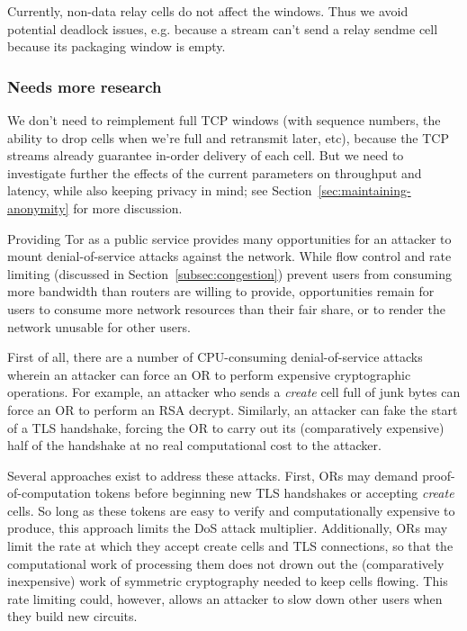 \documentclass[times,10pt,twocolumn]{article}
\begin{document}
Currently, non-data relay cells do not affect the windows. Thus we
avoid potential deadlock issues, e.g. because a stream can't send a
relay sendme cell because its packaging window is empty.

\subsubsection{Needs more research}

We don't need to reimplement full TCP windows (with sequence numbers,
the ability to drop cells when we're full and retransmit later, etc),
because the TCP streams already guarantee in-order delivery of each
cell. But we need to investigate further the effects of the current
parameters on throughput and latency, while also keeping privacy in mind;
see Section~\ref{sec:maintaining-anonymity} for more discussion.


\label{subsec:dos}

Providing Tor as a public service provides many opportunities for an
attacker to mount denial-of-service attacks against the network.  While
flow control and rate limiting (discussed in
Section~\ref{subsec:congestion}) prevent users from consuming more
bandwidth than routers are willing to provide, opportunities remain for
users to
consume more network resources than their fair share, or to render the
network unusable for other users.

First of all, there are a number of CPU-consuming denial-of-service
attacks wherein an attacker can force an OR to perform expensive
cryptographic operations.  For example, an attacker who sends a
\emph{create} cell full of junk bytes can force an OR to perform an RSA
decrypt.  Similarly, an attacker can
fake the start of a TLS handshake, forcing the OR to carry out its
(comparatively expensive) half of the handshake at no real computational
cost to the attacker.

Several approaches exist to address these attacks. First, ORs may
demand proof-of-computation tokens \cite{hashcash} before beginning new
TLS handshakes or accepting \emph{create} cells.  So long as these
tokens are easy to verify and computationally expensive to produce, this
approach limits the DoS attack multiplier.  Additionally, ORs may limit
the rate at which they accept create cells and TLS connections, so that
the computational work of processing them does not drown out the (comparatively
inexpensive) work of symmetric cryptography needed to keep cells
flowing.  This rate limiting could, however, allows an attacker
to slow down other users when they build new circuits.
\end{document}
